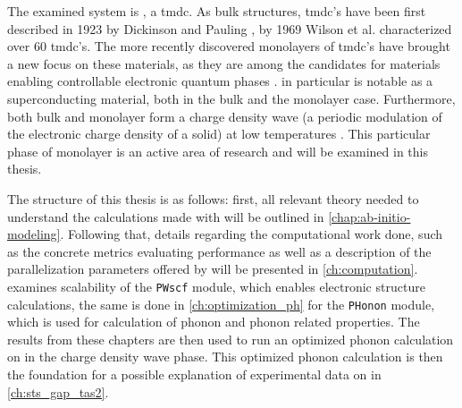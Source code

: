 \documentclass[main.tex]{subfiles}
\begin{document}
The examined system is \TaS, a \acrfull{tmdc}.
As bulk structures, \acrshort{tmdc}'s have been first described in 1923 by Dickinson and Pauling \cite{dickinson_crystal_1923}, by 1969 Wilson et al. characterized over 60 \acrshort{tmdc}'s.
The more recently discovered monolayers of \acrshort{tmdc}'s \cite{novoselov_two-dimensional_2005} have brought a new focus on these materials, as they are among the candidates for materials enabling controllable electronic quantum phases \cite{basov_towards_2017}.
\TaS in particular is notable as a superconducting material, both in the bulk and the monolayer case.
Furthermore, both bulk and monolayer \TaS form a charge density wave (a periodic modulation of the electronic charge density of a solid) at low temperatures \cite{hall_environmental_2019}.
This particular phase of monolayer \TaS is an active area of research and will be examined in this thesis.

The structure of this thesis is as follows:
first, all relevant theory needed to understand the calculations made with \QE will be outlined in \cref{chap:ab-initio-modeling}.
Following that, details regarding the computational work done, such as the concrete metrics evaluating performance as well as a description of the parallelization parameters offered by \QE will be presented in \cref{ch:computation}.
 examines scalability of the \texttt{PWscf} module, which enables electronic structure calculations, the same is done in \cref{ch:optimization_ph} for the \texttt{PHonon} module, which is used for calculation of phonon and phonon related properties. 
The results from these chapters are then used to run an optimized phonon calculation on \TaS in the charge density wave phase.
This optimized phonon calculation is then the foundation for a possible explanation of experimental data on \TaS in \cref{ch:sts_gap_tas2}.
\end{document}
